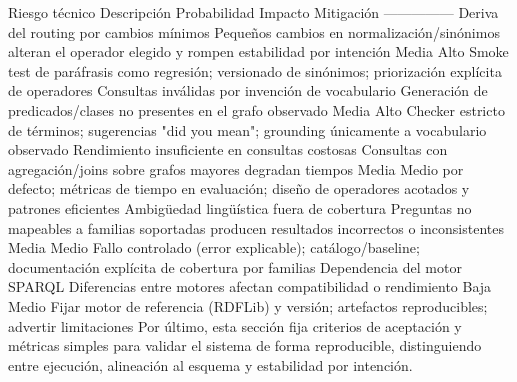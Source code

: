 {}\markdownRendererPipe{} Riesgo técnico \markdownRendererPipe{} Descripción \markdownRendererPipe{} Probabilidad \markdownRendererPipe{} Impacto \markdownRendererPipe{} Mitigación \markdownRendererPipe{} \markdownRendererPipe{}---\markdownRendererPipe{}---\markdownRendererPipe{}---\markdownRendererPipe{}---\markdownRendererPipe{}---\markdownRendererPipe{} \markdownRendererPipe{} Deriva del routing por cambios mínimos \markdownRendererPipe{} Pequeños cambios en normalización/sinónimos alteran el operador elegido y rompen estabilidad por intención \markdownRendererPipe{} Media \markdownRendererPipe{} Alto \markdownRendererPipe{} Smoke test de paráfrasis como regresión; versionado de sinónimos; priorización explícita de operadores \markdownRendererPipe{} \markdownRendererPipe{} Consultas inválidas por invención de vocabulario \markdownRendererPipe{} Generación de predicados/clases no presentes en el grafo observado \markdownRendererPipe{} Media \markdownRendererPipe{} Alto \markdownRendererPipe{} Checker estricto de términos; sugerencias "did you mean"; grounding únicamente a vocabulario observado \markdownRendererPipe{} \markdownRendererPipe{} Rendimiento insuficiente en consultas costosas \markdownRendererPipe{} Consultas con agregación/joins sobre grafos mayores degradan tiempos \markdownRendererPipe{} Media \markdownRendererPipe{} Medio \markdownRendererPipe{}  por defecto; métricas de tiempo en evaluación; diseño de operadores acotados y patrones eficientes \markdownRendererPipe{} \markdownRendererPipe{} Ambigüedad lingüística fuera de cobertura \markdownRendererPipe{} Preguntas no mapeables a familias soportadas producen resultados incorrectos o inconsistentes \markdownRendererPipe{} Media \markdownRendererPipe{} Medio \markdownRendererPipe{} Fallo controlado (error explicable); catálogo/baseline; documentación explícita de cobertura por familias \markdownRendererPipe{} \markdownRendererPipe{} Dependencia del motor SPARQL \markdownRendererPipe{} Diferencias entre motores afectan compatibilidad o rendimiento \markdownRendererPipe{} Baja \markdownRendererPipe{} Medio \markdownRendererPipe{} Fijar motor de referencia (RDFLib) y versión; artefactos reproducibles; advertir limitaciones \markdownRendererPipe{}\markdownRendererInterblockSeparator
{}\markdownRendererInterblockSeparator
{}Por último, esta sección fija criterios de aceptación y métricas simples para validar el sistema de forma reproducible, distinguiendo entre ejecución, alineación al esquema y estabilidad por intención.\markdownRendererInterblockSeparator

